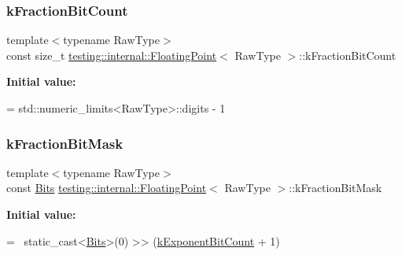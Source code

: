 \subsubsection{\texorpdfstring{k\+Fraction\+Bit\+Count}{kFractionBitCount}}
{\footnotesize\ttfamily template$<$typename Raw\+Type$>$ \\
const size\+\_\+t \hyperlink{classtesting_1_1internal_1_1FloatingPoint}{testing\+::internal\+::\+Floating\+Point}$<$ Raw\+Type $>$\+::k\+Fraction\+Bit\+Count\hspace{0.3cm}{\ttfamily [static]}}

{\bfseries Initial value\+:}
\begin{DoxyCode}
=
    std::numeric\_limits<RawType>::digits - 1
\end{DoxyCode}
\mbox{\label{classtesting_1_1internal_1_1FloatingPoint_a0ac75d4ffd24f14bca452abe8a718da1}} 
\subsubsection{\texorpdfstring{k\+Fraction\+Bit\+Mask}{kFractionBitMask}}
{\footnotesize\ttfamily template$<$typename Raw\+Type$>$ \\
const \hyperlink{classtesting_1_1internal_1_1FloatingPoint_abf228bf6cd48f12c8b44c85b4971a731}{Bits} \hyperlink{classtesting_1_1internal_1_1FloatingPoint}{testing\+::internal\+::\+Floating\+Point}$<$ Raw\+Type $>$\+::k\+Fraction\+Bit\+Mask\hspace{0.3cm}{\ttfamily [static]}}

{\bfseries Initial value\+:}
\begin{DoxyCode}
=
    ~static\_cast<\hyperlink{classtesting_1_1internal_1_1FloatingPoint_abf228bf6cd48f12c8b44c85b4971a731}{Bits}>(0) >> (\hyperlink{classtesting_1_1internal_1_1FloatingPoint_a1973d843c00781053d3073daa8a40119}{kExponentBitCount} + 1)
\end{DoxyCode}
\mbox{\label{classtesting_1_1internal_1_1FloatingPoint_aac498b3714d93f8e88cdc30e4c5935f6}} 
